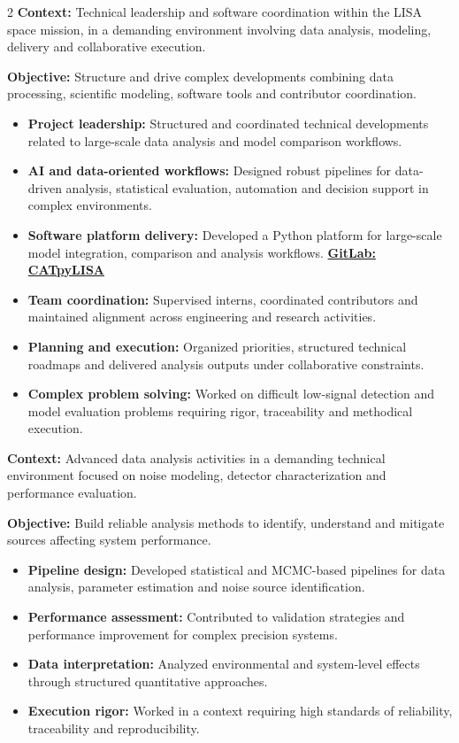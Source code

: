 \documentclass[8pt,a4paper,ragged2e,withhyper]{altacv}
\begin{document}
\begin{paracol}{2}
\textbf{Context:} Technical leadership and software coordination within the LISA space mission, in a demanding environment involving data analysis, modeling, delivery and collaborative execution.

\textbf{Objective:} Structure and drive complex developments combining data processing, scientific modeling, software tools and contributor coordination.

\begin{itemize}
\item \textbf{Project leadership:} Structured and coordinated technical developments related to large-scale data analysis and model comparison workflows.
\item \textbf{AI and data-oriented workflows:} Designed robust pipelines for data-driven analysis, statistical evaluation, automation and decision support in complex environments.
\item \textbf{Software platform delivery:} Developed a Python platform for large-scale model integration, comparison and analysis workflows. \textcolor{DarkPastelRed}{\href{https://gitlab.oca.eu/gboileau/lisa_l3_tools}{\bf GitLab: CATpyLISA}}
\item \textbf{Team coordination:} Supervised interns, coordinated contributors and maintained alignment across engineering and research activities.
\item \textbf{Planning and execution:} Organized priorities, structured technical roadmaps and delivered analysis outputs under collaborative constraints.
\item \textbf{Complex problem solving:} Worked on difficult low-signal detection and model evaluation problems requiring rigor, traceability and methodical execution.
\end{itemize}

\divider


\textbf{Context:} Advanced data analysis activities in a demanding technical environment focused on noise modeling, detector characterization and performance evaluation.

\textbf{Objective:} Build reliable analysis methods to identify, understand and mitigate sources affecting system performance.

\begin{itemize}
\item \textbf{Pipeline design:} Developed statistical and MCMC-based pipelines for data analysis, parameter estimation and noise source identification.
\item \textbf{Performance assessment:} Contributed to validation strategies and performance improvement for complex precision systems.
\item \textbf{Data interpretation:} Analyzed environmental and system-level effects through structured quantitative approaches.
\item \textbf{Execution rigor:} Worked in a context requiring high standards of reliability, traceability and reproducibility.
\end{itemize}


\end{paracol}
\end{document}
